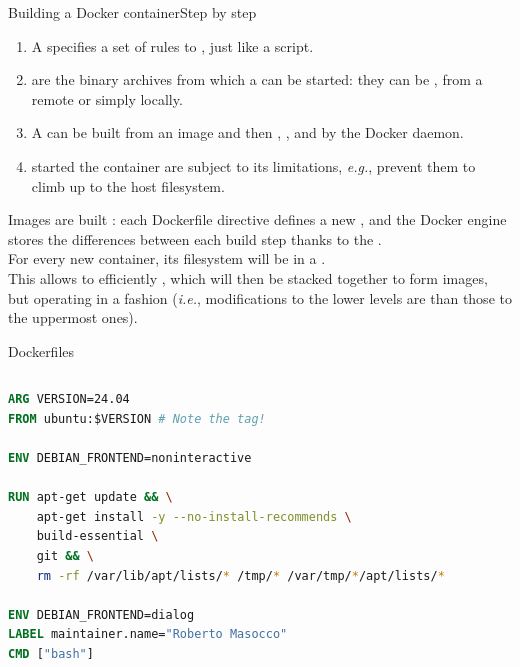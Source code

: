 \begin{frame}{Building a Docker container}{Step by step}
  \justifying
	\begin{enumerate}
		\item A  specifies a set of rules to , just like a script.
      \item {} are the binary archives from which a  can be started: they can be ,  from a remote  or simply  locally.
		\item A  can be built from an image and then , , and  by the Docker daemon.
		\item {} started  the container are subject to its limitations, \emph{e.g.},  prevent them to climb up to the host filesystem.
	\end{enumerate}
	Images are built : each Dockerfile directive defines a new , and the Docker engine stores the differences between each build step thanks to the .\\
	For every new container, its filesystem will be in a .\\
	This allows to efficiently , which will then be stacked together to form images, but operating in a  fashion (\emph{i.e.}, modifications to the lower levels are  than those to the uppermost ones).
\end{frame}

\begin{frame}[fragile]{Dockerfiles}
	\begin{columns}
		\begin{lstlisting}[language=Dockerfile, caption=Minimal example of a Dockerfile running a Bash shell in a Ubuntu container.]
ARG VERSION=24.04
FROM ubuntu:$VERSION # Note the tag!

ENV DEBIAN_FRONTEND=noninteractive

RUN apt-get update && \
    apt-get install -y --no-install-recommends \
    build-essential \
    git && \
    rm -rf /var/lib/apt/lists/* /tmp/* /var/tmp/*/apt/lists/*

ENV DEBIAN_FRONTEND=dialog
LABEL maintainer.name="Roberto Masocco"
CMD ["bash"]
\end{lstlisting}
	\end{columns}
\end{frame}

